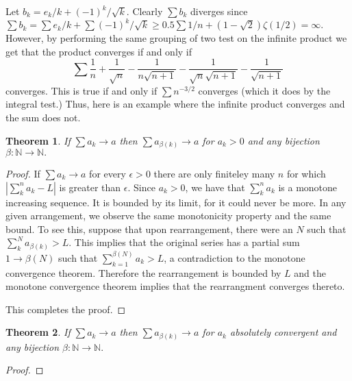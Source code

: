 \documentclass[letter]{article}
\newtheorem{theorem}{Theorem}
\newenvironment{menumerate}{%
  \edef\backupindent{\the\parindent}%
  \enumerate%
  \setlength{\parindent}{\backupindent}%
}{\endenumerate}
\begin{document}
\begin{menumerate}
\begin{menumerate}
			\item Let $b_k = e_k/k + (-1)^k/\sqrt{k}.$ Clearly $\sum b_k$ diverges since $\sum b_k = \sum e_k/k + \sum (-1)^k/\sqrt{k} \geq 0.5\sum 1/n + (1- \sqrt{2})\zeta(1/2) = \infty.$ However, by performing the same grouping of two test on the infinite product we get that the product converges if and only if $$\sum \frac{1}{n} + \frac{1}{\sqrt{n}} - \frac{1}{n\sqrt{n+1}} - \frac{1}{\sqrt{n}\sqrt{n+1}} - \frac{1}{\sqrt{n+1}}$$ converges. This is true if and only if $\sum n^{-3/2}$ converges (which it does by the integral test.) Thus, here is an example where the infinite product converges and the sum does not.
		\end{menumerate}

		\item 
		\begin{theorem}
			If $\sum a_k \to a$ then $\sum a_{\beta(k)} \to a$ for $a_k > 0$ and any bijection $\beta: \mathbb{N} \to \mathbb{N}.$
		\end{theorem}
		\begin{proof}
			If $\sum {a_k} \to a$ for every $\epsilon > 0$ there are only finiteley many $n$ for which $|\sum_{k}^n a_k - L|$ is greater than $\epsilon.$ Since $a_k > 0$, we have that $\sum^n_k a_k$ is a monotone increasing sequence. It is bounded by its limit, for it could never be more. In any given arrangement, we observe the same monotonicity property and the same bound. To see this, suppose that upon rearrangement, there were an $N$ such that $\sum_k^N a_{\beta(k)} > L.$ This implies that the original series has a partial sum $1\to\beta(N)$ such that $\sum^{\beta(N)}_{k=1} a_k > L$, a contradiction to the monotone convergence theorem. Therefore the rearrangement is bounded by $L$ and the monotone convergence theorem implies that the rearrangment converges thereto. 

			This completes the proof.
		\end{proof}

	\begin{theorem} 
			If $\sum a_k \to a$ then $\sum a_{\beta(k)} \to a$ for $a_k$ absolutely convergent and any bijection $\beta: \mathbb{N} \to \mathbb{N}.$
		\end{theorem}
		\begin{proof}


\end{proof}
\end{menumerate}
\end{document}
